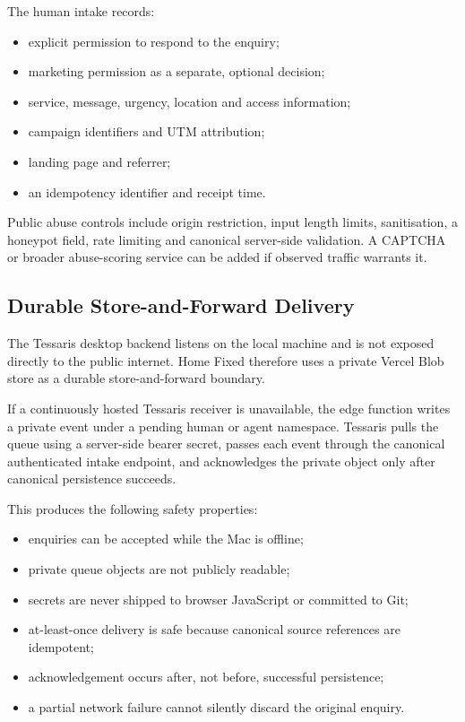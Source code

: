 The human intake records:

\begin{itemize}
  \item explicit permission to respond to the enquiry;
  \item marketing permission as a separate, optional decision;
  \item service, message, urgency, location and access information;
  \item campaign identifiers and UTM attribution;
  \item landing page and referrer;
  \item an idempotency identifier and receipt time.
\end{itemize}

Public abuse controls include origin restriction, input length limits, sanitisation, a honeypot field, rate limiting and canonical server-side validation.  A CAPTCHA or broader abuse-scoring service can be added if observed traffic warrants it.

\subsection{Durable Store-and-Forward Delivery}

The Tessaris desktop backend listens on the local machine and is not exposed directly to the public internet.  Home Fixed therefore uses a private Vercel Blob store as a durable store-and-forward boundary.

If a continuously hosted Tessaris receiver is unavailable, the edge function writes a private event under a pending human or agent namespace.  Tessaris pulls the queue using a server-side bearer secret, passes each event through the canonical authenticated intake endpoint, and acknowledges the private object only after canonical persistence succeeds.

This produces the following safety properties:

\begin{itemize}
  \item enquiries can be accepted while the Mac is offline;
  \item private queue objects are not publicly readable;
  \item secrets are never shipped to browser JavaScript or committed to Git;
  \item at-least-once delivery is safe because canonical source references are idempotent;
  \item acknowledgement occurs after, not before, successful persistence;
  \item a partial network failure cannot silently discard the original enquiry.
\end{itemize}

